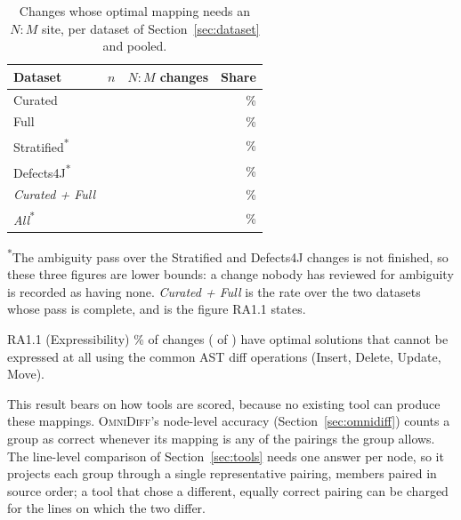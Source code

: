 \documentclass[sigconf]{acmart}
\begin{document}
\begin{table}
  \caption{Changes whose optimal mapping needs an $N{:}M$ site, per dataset of
  Section~\ref{sec:dataset} and pooled.}
  \label{tab:expressibility}
  \begin{tabular}{lrrr}
    \toprule
    Dataset & $n$ & $N{:}M$ changes & Share \\
    \midrule
    Curated & \AmbiguityCuratedTotal{} & \AmbiguityCuratedWith{} & \AmbiguityCuratedPct{}\% \\
    Full & \AmbiguityFullTotal{} & \AmbiguityFullWith{} & \AmbiguityFullPct{}\% \\
    Stratified\textsuperscript{*} & \AmbiguityStratifiedTotal{} & \AmbiguityStratifiedWith{} &
      \AmbiguityStratifiedPct{}\% \\
    Defects4J\textsuperscript{*} & \AmbiguityDefectsFourJTotal{} & \AmbiguityDefectsFourJWith{} &
      \AmbiguityDefectsFourJPct{}\% \\
    \midrule
    \emph{Curated + Full} & \AmbiguityListScored{} & \AmbiguityListWith{} & \AmbiguityListPct{}\% \\
    \emph{All}\textsuperscript{*} & \AmbiguityScored{} & \AmbiguityAnyFixtures{} &
      \AmbiguityAnyPct{}\% \\
    \bottomrule
  \end{tabular}

  \vspace{2pt}
  \footnotesize\textsuperscript{*}The ambiguity pass over the Stratified and Defects4J changes is
  not finished, so these three figures are lower bounds: a change nobody has reviewed for ambiguity
  is recorded as having none. \emph{Curated + Full} is the rate over the two datasets whose pass is
  complete, and is the figure RA1.1 states.
\end{table}

\begin{resultbox}{RA1.1 (Expressibility)}
  \AmbiguityListPct{}\% of changes (\AmbiguityListWith{} of \AmbiguityListScored{}) have optimal
  solutions that cannot be expressed at all using the common AST diff operations (Insert, Delete,
  Update, Move).
\end{resultbox}

This result bears on how tools are scored, because no existing tool can produce these mappings.
\textsc{OmniDiff}'s node-level accuracy (Section~\ref{sec:omnidiff}) counts a group as correct
whenever its mapping is any of the pairings the group allows. The line-level comparison of
Section~\ref{sec:tools} needs one answer per node, so it projects each group through a single
representative pairing, members paired in source order; a tool that chose a different, equally
correct pairing can be charged for the lines on which the two differ.
\end{document}
